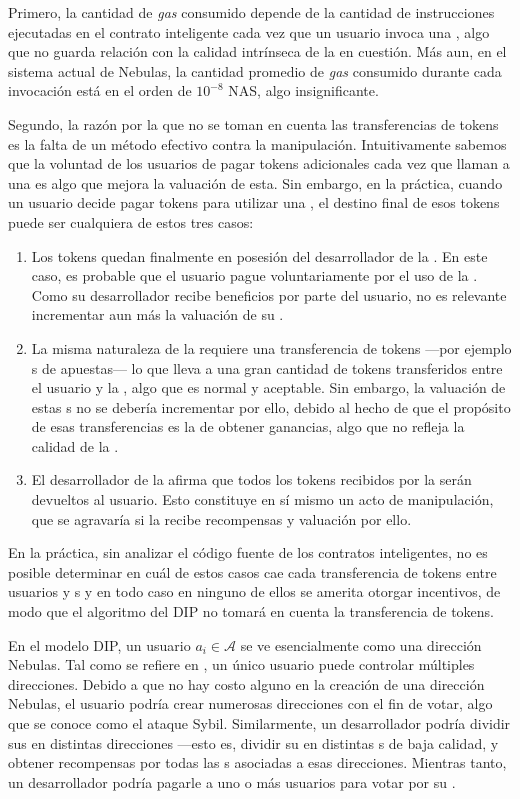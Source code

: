  Primero, la cantidad de \textit{gas} consumido depende de la cantidad de instrucciones ejecutadas en el contrato inteligente cada vez que un usuario invoca una \dapp, algo que no guarda relación con la calidad intrínseca de la \dapp en cuestión. Más aun, en el sistema actual de Nebulas, la cantidad promedio de \textit{gas} consumido durante cada invocación está en el orden de $10^{-8}$ NAS, algo insignificante.

 Segundo, la razón por la que no se toman en cuenta las transferencias de tokens es la falta de un método efectivo contra la manipulación. Intuitivamente sabemos que la voluntad de los usuarios de pagar tokens adicionales cada vez que llaman a una \dapp es algo que mejora la valuación de esta. Sin embargo, en la práctica, cuando un usuario decide pagar tokens para utilizar una \dapp, el destino final de esos tokens puede ser cualquiera de estos tres casos:

  \begin{enumerate}
  	 \item Los tokens quedan finalmente en posesión del desarrollador de la \dapp. En este caso, es probable que el usuario pague voluntariamente por el uso de la \dapp. Como su desarrollador recibe beneficios por parte del usuario, no es relevante incrementar aun más la valuación de su \dapp.
  	\item La misma naturaleza de la \dapp requiere una transferencia de tokens —por ejemplo {\dapp}s de apuestas— lo que lleva a una gran cantidad de tokens transferidos entre el usuario y la \dapp, algo que es normal y aceptable. Sin embargo, la valuación de estas {\dapp}s no se debería incrementar por ello, debido al hecho de que el propósito de esas transferencias es la de obtener ganancias, algo que no refleja la calidad de la \dapp.
   \item El desarrollador de la \dapp afirma que todos los tokens recibidos por la \dapp serán devueltos al usuario. Esto constituye en sí mismo un acto de manipulación, que se agravaría si la \dapp recibe recompensas y valuación por ello.
  \end{enumerate}
  En la práctica, sin analizar el código fuente de los contratos inteligentes, no es posible determinar en cuál de estos casos cae cada transferencia de tokens entre usuarios y  {\dapp}s y en todo caso en ninguno de ellos se amerita otorgar incentivos, de modo que el algoritmo del DIP no tomará en cuenta la transferencia de tokens.

  En el modelo DIP, un usuario $a_i \in \mathcal{A}$ se ve esencialmente como una dirección Nebulas. Tal como se refiere en \cite{Nebulasyellowpaper}, un único usuario puede controlar múltiples direcciones. Debido a que no hay costo alguno en la creación de una dirección Nebulas, el usuario podría crear numerosas direcciones con el fin de votar, algo que se conoce como el ataque Sybil. Similarmente, un desarrollador podría dividir sus \dapp en distintas direcciones —esto es, dividir su \dapp en distintas {\dapp}s de baja calidad, y obtener recompensas por todas las {\dapp}s asociadas a esas direcciones. Mientras tanto, un desarrollador podría pagarle a uno o más usuarios para votar por su \dapp.

